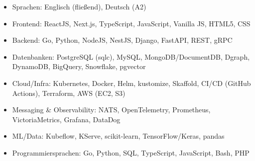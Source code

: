\documentclass[10pt,a4paper]{resume}
\begin{document}
\begin{itemize}[leftmargin=1.4em,nosep,topsep=2pt]
  \item Sprachen: Englisch (fließend), Deutsch (A2)
  \item Frontend: ReactJS, Next.js, TypeScript, JavaScript, Vanilla JS, HTML5, CSS
  \item Backend: Go, Python, NodeJS, NestJS, Django, FastAPI, REST, gRPC
  \item Datenbanken: PostgreSQL (sqlc), MySQL, MongoDB/DocumentDB, Dgraph, DynamoDB, BigQuery, Snowflake, pgvector
  \item Cloud/Infra: Kubernetes, Docker, Helm, kustomize, Skaffold, CI/CD (GitHub Actions), Terraform, AWS (EC2, S3)
  \item Messaging \& Observability: NATS, OpenTelemetry, Prometheus, VictoriaMetrics, Grafana, DataDog
  \item ML/Data: Kubeflow, KServe, scikit-learn, TensorFlow/Keras, pandas
  \item Programmiersprachen: Go, Python, SQL, TypeScript, JavaScript, Bash, PHP
\end{itemize}
\end{document}
